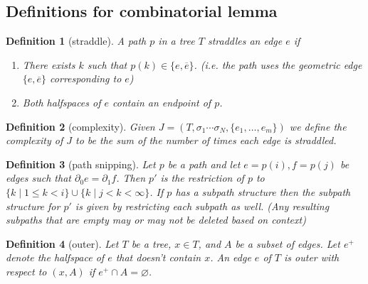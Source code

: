 \documentclass{article}
\theoremstyle{mystyle}
\newtheorem{defn}{Definition}
\theoremstyle{remark}
\begin{document}
\subsection{Definitions for combinatorial lemma}
\begin{defn}
	[straddle]
	A path \(p\) in a tree \(T\) {\em straddles} an edge \(e\) if
	\begin{enumerate}
		\item There exists \(k\) such that \(p(k) \in  \{e, \overline{e}\}\). (i.e. the path uses the geometric edge \(\{e , \overline{e}\}\) corresponding to  \(e\))
		\item Both halfspaces of \(e\) contain an endpoint of \(p\).
	\end{enumerate}
\end{defn}
\begin{defn}
	[complexity]
	Given \(J=(T, \sigma_{1} \cdots \sigma_{N} , \{e_{1} , \ldots, e_{m}\})\) we define the {\em complexity} of \(J\) to be the sum of the number of times each edge is straddled.
\end{defn}
\begin{defn}
	[path snipping]
	Let \(p\) be a path and let \(e=p(i), f=p(j)\) be edges such that \(\partial_{0}  e = \partial_{1} f \). Then \(p'\) is the restriction of \(p\) to \(\{k\mid 1 \leq k < i\} \cup \{k \mid j < k < \infty\}\). If \(p\) has a subpath structure then the subpath structure for \(p'\) is given by restricting each subpath as well. (Any resulting subpaths that are empty may or may not be deleted based on context)
	
\end{defn}
\begin{defn}
	[outer]
	Let \(T\) be a tree, \(x \in T\), and \(A\) be a subset of edges. Let \(e^{+}\) denote the halfspace of \(e\) that doesn't contain \(x\). An edge \(e\) of \(T\) is {\em outer} with respect to \((x,A)\) if \(e^{+} \cap A=\varnothing\).  
\end{defn}
\end{document}
